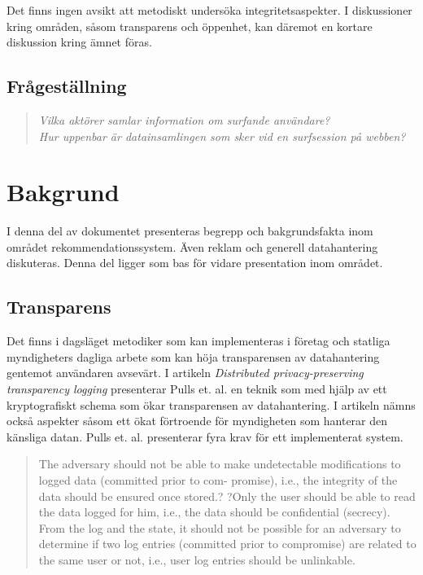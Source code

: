 \documentclass[a4paper,11pt]{article}
\begin{document}
{Det finns ingen avsikt att metodiskt undersöka integritetsaspekter. I diskussioner kring områden, såsom transparens och öppenhet, kan däremot en kortare diskussion kring ämnet föras.

\subsection{Frågeställning}

\begin{quote}
\textit{Vilka aktörer samlar information om surfande användare?} \\

\textit{Hur uppenbar är datainsamlingen som sker vid en surfsession på webben?}
\end{quote}

\section{Bakgrund}
I denna del av dokumentet presenteras begrepp och bakgrundsfakta inom området rekommendationssystem. Även reklam och generell datahantering diskuteras. Denna del ligger som bas för vidare presentation inom området. 
\subsection{Transparens}
Det finns i dagsläget metodiker som kan implementeras i företag och statliga myndigheters dagliga arbete som kan höja transparensen av datahantering gentemot användaren avsevärt. I artikeln \textit{Distributed privacy-preserving transparency logging} presenterar Pulls et. al. \cite{Pulls} en teknik som med hjälp av ett kryptografiskt schema som ökar transparensen av datahantering. I artikeln nämns också aspekter såsom ett ökat förtroende för myndigheten som hanterar den känsliga datan. Pulls et. al. \cite{Pulls} presenterar fyra krav för ett implementerat system. 

\begin{quote}


The adversary should not be able to make undetectable modifications to logged data (committed prior to com- promise), i.e., the integrity of the data should be ensured once stored.?
?Only the user should be able to read the data logged for him, i.e., the data should be confidential (secrecy). \\


From the log and the state, it should not be possible for an adversary to determine if two log entries (committed prior to compromise) are related to the same user or not, i.e., user log entries should be unlinkable. \\


\end{quote}}
\end{document}
